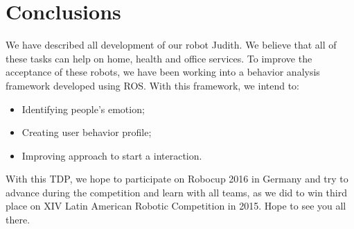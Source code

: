 \section{Conclusions}

We have described all development of our robot Judith. We believe that all of these tasks can help on home, health and office services. To improve the acceptance of these robots, we have been working into a behavior analysis framework developed using ROS. With this framework, we intend to:

\begin{itemize}
    \item Identifying people's emotion;
    \item Creating user behavior profile;
    \item Improving approach to start a interaction.
\end{itemize}

With this TDP, we hope to participate on Robocup 2016 in Germany and try to advance during the competition and learn with all teams, as we did to win third place on XIV Latin American Robotic Competition in 2015. Hope to see you all there.
